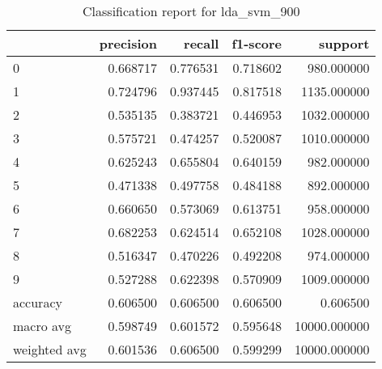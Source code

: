 \begin{table}[htb!]
\centering
\caption{Classification report for lda_svm_900}
\label{tab:classification-report-lda_svm_900}
\begin{tabular}{lrrrr}
\toprule
 & precision & recall & f1-score & support \\
\midrule
0 & 0.668717 & 0.776531 & 0.718602 & 980.000000 \\
1 & 0.724796 & 0.937445 & 0.817518 & 1135.000000 \\
2 & 0.535135 & 0.383721 & 0.446953 & 1032.000000 \\
3 & 0.575721 & 0.474257 & 0.520087 & 1010.000000 \\
4 & 0.625243 & 0.655804 & 0.640159 & 982.000000 \\
5 & 0.471338 & 0.497758 & 0.484188 & 892.000000 \\
6 & 0.660650 & 0.573069 & 0.613751 & 958.000000 \\
7 & 0.682253 & 0.624514 & 0.652108 & 1028.000000 \\
8 & 0.516347 & 0.470226 & 0.492208 & 974.000000 \\
9 & 0.527288 & 0.622398 & 0.570909 & 1009.000000 \\
accuracy & 0.606500 & 0.606500 & 0.606500 & 0.606500 \\
macro avg & 0.598749 & 0.601572 & 0.595648 & 10000.000000 \\
weighted avg & 0.601536 & 0.606500 & 0.599299 & 10000.000000 \\
\bottomrule
\end{tabular}
\end{table}
